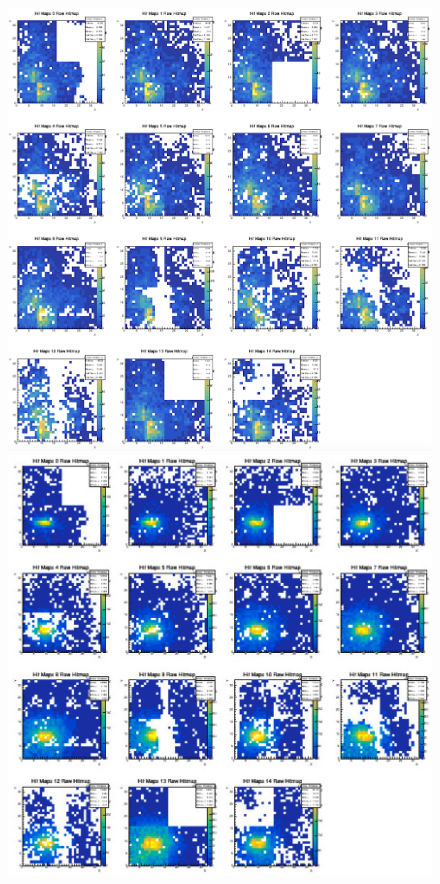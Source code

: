 \begin{figure}[H]
\begin{minipage}[b]{0.45\linewidth}
  \end{minipage}
  \begin{minipage}[b]{0.45\linewidth}
    \centering
    \includegraphics[keepaspectratio, scale=0.2]{Figure/Beamtest/hitmap_mu150.png}
   \end{minipage}
   \hfill
  \begin{minipage}[b]{0.45\linewidth}
    \centering
    \includegraphics[keepaspectratio, scale=0.2]{Figure/Beamtest/hitmap_pi150.png}

\end{minipage}
\end{figure}
